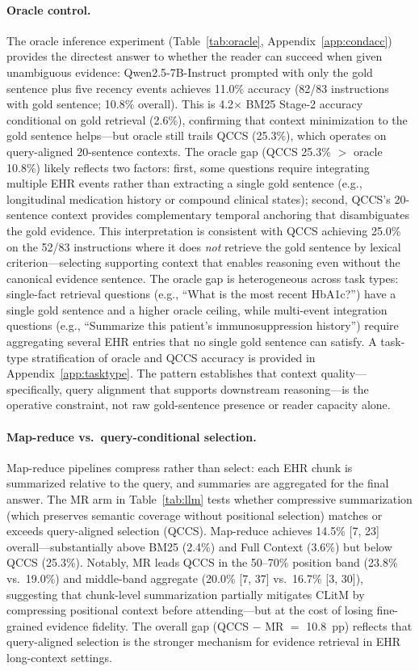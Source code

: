 \documentclass{article}
\begin{document}
\paragraph{Oracle control.}
The oracle inference experiment (Table~\ref{tab:oracle}, Appendix~\ref{app:condacc})
provides the directest answer to whether the reader can succeed when given
unambiguous evidence: Qwen2.5-7B-Instruct prompted with only the gold sentence
plus five recency events achieves 11.0\% accuracy (82/83 instructions with gold
sentence; 10.8\% overall). This is 4.2$\times$ BM25 Stage-2 accuracy
conditional on gold retrieval (2.6\%), confirming that context minimization to
the gold sentence helps---but oracle still trails QCCS (25.3\%), which operates
on query-aligned 20-sentence contexts.
The oracle gap (QCCS 25.3\% $>$ oracle 10.8\%) likely reflects two factors:
first, some questions require integrating multiple EHR events rather than
extracting a single gold sentence (e.g., longitudinal medication history or
compound clinical states); second, QCCS's 20-sentence context provides
complementary temporal anchoring that disambiguates the gold evidence. This
interpretation is consistent with QCCS achieving 25.0\% on the 52/83 instructions
where it does \emph{not} retrieve the gold sentence by lexical criterion---selecting
supporting context that enables reasoning even without the canonical evidence sentence.
The oracle gap is heterogeneous across task types: single-fact retrieval questions
(e.g., ``What is the most recent HbA1c?'') have a single gold sentence and a
higher oracle ceiling, while multi-event integration questions (e.g., ``Summarize
this patient's immunosuppression history'') require aggregating several EHR entries
that no single gold sentence can satisfy. A task-type stratification of oracle and
QCCS accuracy is provided in Appendix~\ref{app:tasktype}.
The pattern establishes that context quality---specifically, query alignment that
supports downstream reasoning---is the operative constraint, not raw gold-sentence
presence or reader capacity alone.

\paragraph{Map-reduce vs.\ query-conditional selection.}
Map-reduce pipelines compress rather than select: each EHR chunk is summarized
relative to the query, and summaries are aggregated for the final answer.
The MR arm in Table~\ref{tab:llm} tests whether compressive summarization
(which preserves semantic coverage without positional selection) matches or
exceeds query-aligned selection (QCCS). Map-reduce achieves 14.5\% [7, 23]
overall---substantially above BM25 (2.4\%) and Full Context (3.6\%) but below
QCCS (25.3\%). Notably, MR leads QCCS in the 50--70\% position band (23.8\%
vs.\ 19.0\%) and middle-band aggregate (20.0\% [7, 37] vs.\ 16.7\% [3, 30]),
suggesting that chunk-level summarization partially mitigates CLitM by
compressing positional context before attending---but at the cost of losing
fine-grained evidence fidelity. The overall gap (QCCS $-$ MR $=$ 10.8~pp)
reflects that query-aligned selection is the stronger mechanism for evidence
retrieval in EHR long-context settings.
\end{document}

